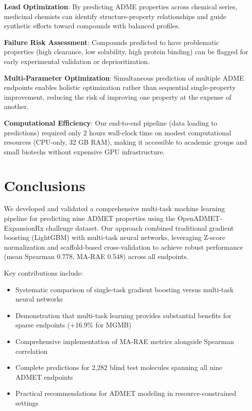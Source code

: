 \documentclass[11pt,a4paper]{article}
\begin{document}
\textbf{Lead Optimization}: By predicting ADME properties across chemical series, medicinal chemists can identify structure-property relationships and guide synthetic efforts toward compounds with balanced profiles.

\textbf{Failure Risk Assessment}: Compounds predicted to have problematic properties (high clearance, low solubility, high protein binding) can be flagged for early experimental validation or deprioritization.

\textbf{Multi-Parameter Optimization}: Simultaneous prediction of multiple ADME endpoints enables holistic optimization rather than sequential single-property improvement, reducing the risk of improving one property at the expense of another.

\textbf{Computational Efficiency}: Our end-to-end pipeline (data loading to predictions) required only 2 hours wall-clock time on modest computational resources (CPU-only, 32 GB RAM), making it accessible to academic groups and small biotechs without expensive GPU infrastructure.

\section{Conclusions}

We developed and validated a comprehensive multi-task machine learning pipeline for predicting nine ADMET properties using the OpenADMET-ExpansionRx challenge dataset. Our approach combined traditional gradient boosting (LightGBM) with multi-task neural networks, leveraging Z-score normalization and scaffold-based cross-validation to achieve robust performance (mean Spearman 0.778, MA-RAE 0.548) across all endpoints.

Key contributions include:
\begin{itemize}
    \item Systematic comparison of single-task gradient boosting versus multi-task neural networks
    \item Demonstration that multi-task learning provides substantial benefits for sparse endpoints (+16.9\% for MGMB)
    \item Comprehensive implementation of MA-RAE metrics alongside Spearman correlation
    \item Complete predictions for 2,282 blind test molecules spanning all nine ADMET endpoints
    \item Practical recommendations for ADMET modeling in resource-constrained settings
\end{itemize}
\end{document}

